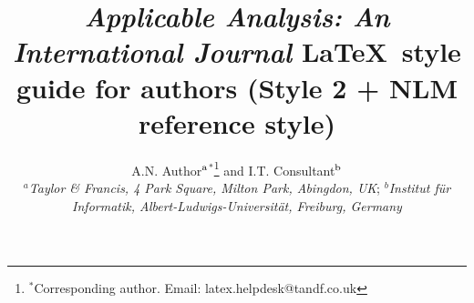 \documentclass{gAPA2e}
\theoremstyle{plain}
\theoremstyle{remark}
\theoremstyle{definition}
\begin{document}


\title{{\itshape Applicable Analysis: An International Journal} \LaTeX\ style guide for authors (Style 2 + NLM reference style)}

\author{A.N. Author$^{\rm a}$$^{\ast}$\thanks{$^\ast$Corresponding author. Email: latex.helpdesk@tandf.co.uk
\vspace{6pt}} and I.T. Consultant$^{\rm b}$\\\vspace{6pt}  $^{a}${\em{Taylor \& Francis, 4 Park Square, Milton Park, Abingdon, UK}};
$^{b}${\em{Institut f\"{u}r Informatik, Albert-Ludwigs-Universit\"{a}t, Freiburg,
Germany}}\\ }

\maketitle
\end{document}
